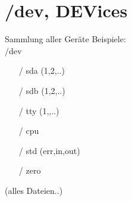\section[/dev]{/dev, DEVices}
\begin{frame}{Sammlung aller Geräte}
Beispiele:\\
/dev
\begin{itemize}
 \item [/] sda (1,2,..)
 \item [/] sdb (1,2,..)
 \item [/] tty (1,\pi,..)
 \item [/] cpu
 \item [/] std (err,in,out)
 \item [/] zero
\end{itemize}
(alles Dateien..)
\end{frame}

